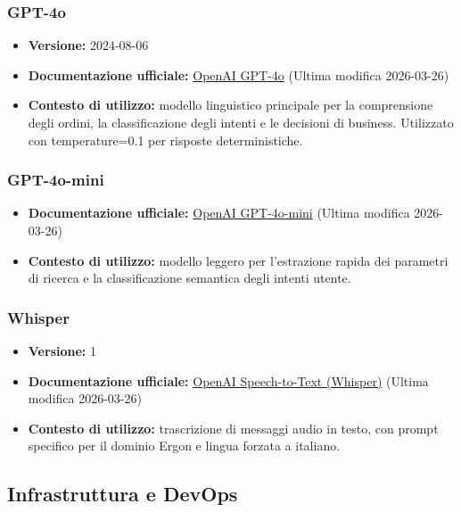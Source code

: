 \documentclass[a4paper, 11pt, oneside]{scrartcl}
\begin{document}
\subsubsection{GPT-4o}
\begin{itemize}[noitemsep]
    \item \textbf{Versione:} 2024-08-06
    \item \textbf{Documentazione ufficiale:} \href{https://platform.openai.com/docs/models/gpt-4o}{OpenAI GPT-4o} (Ultima modifica 2026-03-26)
    \item \textbf{Contesto di utilizzo:} modello linguistico principale per la comprensione degli ordini, la classificazione degli intenti e le decisioni di business. Utilizzato con temperature=0.1 per risposte deterministiche.
\end{itemize}

\subsubsection{GPT-4o-mini}
\begin{itemize}[noitemsep]
    \item \textbf{Documentazione ufficiale:} \href{https://platform.openai.com/docs/models/gpt-4o-mini}{OpenAI GPT-4o-mini} (Ultima modifica 2026-03-26)
    \item \textbf{Contesto di utilizzo:} modello leggero per l'estrazione rapida dei parametri di ricerca e la classificazione semantica degli intenti utente.
\end{itemize}

\subsubsection{Whisper}
\begin{itemize}[noitemsep]
    \item \textbf{Versione:} 1
    \item \textbf{Documentazione ufficiale:} \href{https://platform.openai.com/docs/guides/speech-to-text}{OpenAI Speech-to-Text (Whisper)} (Ultima modifica 2026-03-26)
    \item \textbf{Contesto di utilizzo:} trascrizione di messaggi audio in testo, con prompt specifico per il dominio Ergon e lingua forzata a italiano.
\end{itemize}

\subsection{Infrastruttura e DevOps}
\end{document}

